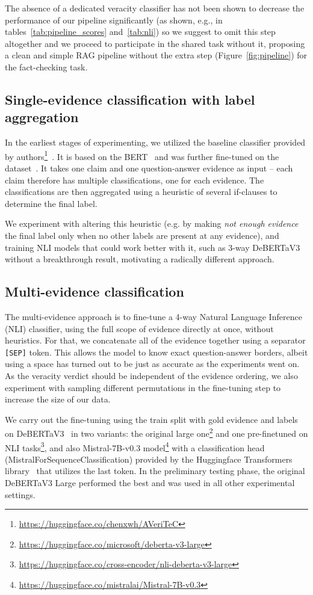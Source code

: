 The absence of a dedicated veracity classifier has not been shown to decrease the performance of our pipeline significantly (as shown, e.g., in tables~\ref{tab:pipeline_scores} and~\ref{tab:nli}) so we suggest to omit this step altogether and we proceed to participate in the \averitec{}  shared task without it, proposing a clean and simple RAG pipeline without the extra step (Figure~\ref{fig:pipeline}) for the fact-checking task.

\subsection{Single-evidence classification with label aggregation}
In the earliest stages of experimenting, we utilized the baseline classifier provided by \averitec{} authors\footnote{\url{https://huggingface.co/chenxwh/AVeriTeC}}~\cite{averitec2024}.
It is based on the BERT~\cite{devlin-etal-2019-bert} and was further fine-tuned on the \averitec{}  dataset~\cite{averitec2024}. 
It takes one claim and one question-answer evidence as input -- each claim therefore has multiple classifications, one for each evidence. The classifications are then aggregated using a heuristic of several if-clauses to determine the final label. 

We experiment with altering this heuristic (e.g. by making \textit{not enough evidence} the final label only when no other labels are present at any evidence), and training NLI models that could work better with it, such as 3-way DeBERTaV3~\cite{he2023debertav3improvingdebertausing} without a breakthrough result, motivating a radically different approach.

\subsection{Multi-evidence classification}
\label{subsubsec:concatenation}
The multi-evidence approach is to fine-tune a 4-way Natural Language Inference (NLI) classifier, using the full scope of evidence directly at once, without heuristics.
For that, we concatenate all of the evidence together using a separator \texttt{[SEP]} token. This allows the model to know exact question-answer borders, albeit using a space has turned out to be just as accurate as the experiments went on. As the veracity verdict should be independent of the evidence ordering, we also experiment with sampling different permutations in the fine-tuning step to increase the size of our data.

We carry out the fine-tuning using the \averitec{} train split with gold evidence and labels on \mbox{DeBERTaV3}~\cite{he2023debertav3improvingdebertausing} in two variants: the original large one\footnote{\url{https://huggingface.co/microsoft/deberta-v3-large}} and one pre-finetuned on NLI tasks\footnote{\url{https://huggingface.co/cross-encoder/nli-deberta-v3-large}}, and also Mistral-7B-v0.3 model\footnote{\url{https://huggingface.co/mistralai/Mistral-7B-v0.3}} with a classification head (MistralForSequenceClassification) provided by the Huggingface Transformers library~\cite{wolf-etal-2020-transformers} that utilizes the last token. In the preliminary testing phase, the original DeBERTaV3 Large performed the best and was used in all other experimental settings.

